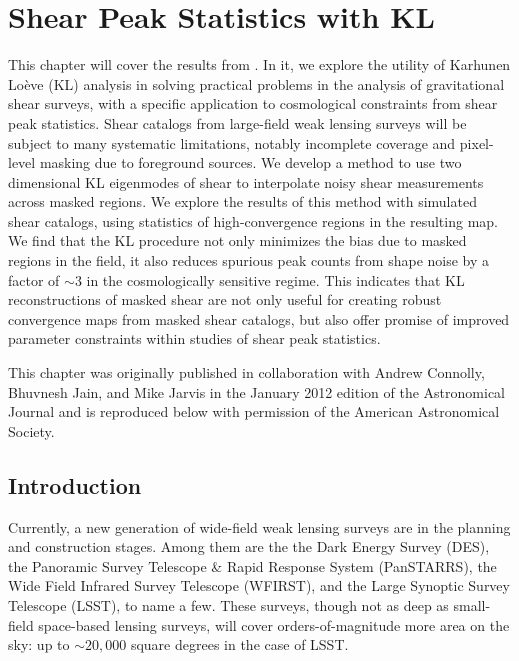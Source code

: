 \chapter{Shear Peak Statistics with KL}

This chapter will cover the results from \citet{Vanderplas2012}. In it,
we explore the utility of Karhunen Lo\`{e}ve (KL) analysis in 
solving practical problems in the analysis of gravitational
shear surveys, with a specific application to cosmological constraints
from shear peak statistics.
Shear catalogs from large-field weak lensing
surveys will be subject to many systematic limitations, notably
incomplete coverage and pixel-level masking due to foreground sources.  
We develop a method to use two dimensional KL eigenmodes of 
shear to interpolate noisy shear measurements across masked regions.  
We explore the results of this method with simulated shear catalogs, 
using statistics of high-convergence regions in the resulting map.  
We find that the KL procedure not only
minimizes the bias due to masked regions in the field, it also reduces
spurious peak counts from shape noise by a factor of $\sim 3$ in the
cosmologically sensitive regime.  This indicates that KL reconstructions 
of masked shear are not only useful for creating robust convergence maps
from masked shear catalogs, but also offer promise of improved parameter
constraints within studies of shear peak statistics.


This chapter was originally published in collaboration with Andrew Connolly,
Bhuvnesh Jain, and Mike Jarvis in the January 2012 edition of the
Astronomical Journal \citep[][ApJ, Vol. 744, p. 180; \copyright ~2012 by
the American Astronomical Society]{Vanderplas2012} and is reproduced below
with permission of the American Astronomical Society.

\section{Introduction}
Currently, a new generation of wide-field weak lensing surveys are
in the planning and construction stages.  
Among them are the the Dark Energy Survey (DES), 
the Panoramic Survey Telescope \& Rapid
Response System (PanSTARRS), the Wide Field Infrared Survey Telescope (WFIRST),
and the Large Synoptic Survey Telescope (LSST), to name a few.
These surveys, though not as deep as small-field space-based lensing surveys,
will cover orders-of-magnitude more area on the sky: up to $\sim 20,000$
square degrees in the case of LSST.

